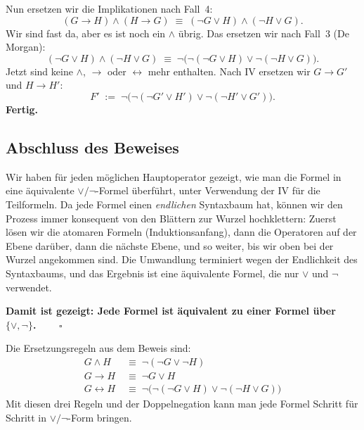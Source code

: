 \documentclass[a4paper,12pt]{article}
\begin{document}
Nun ersetzen wir die Implikationen nach Fall~4:
\[
(G \to H) \wedge (H \to G) \;\equiv\; (\neg G \vee H) \wedge (\neg H \vee G).
\]
Wir sind fast da, aber es ist noch ein $\wedge$ \"ubrig. Das ersetzen
wir nach Fall~3 (De Morgan):
\[
(\neg G \vee H) \wedge (\neg H \vee G) \;\equiv\;
\neg\bigl(\neg(\neg G \vee H) \vee \neg(\neg H \vee G)\bigr).
\]
Jetzt sind keine $\wedge$, $\to$ oder $\leftrightarrow$ mehr
enthalten. Nach IV ersetzen wir $G \to G'$ und $H \to H'$:
\[
F' \;:=\; \neg\bigl(\neg(\neg G' \vee H') \vee \neg(\neg H' \vee G')\bigr).
\]
\textbf{Fertig.}

\subsection*{Abschluss des Beweises}

Wir haben f\"ur jeden m\"oglichen Hauptoperator gezeigt, wie man die
Formel in eine \"aquivalente $\vee/\neg$-Formel \"uberf\"uhrt, unter
Verwendung der IV f\"ur die Teilformeln. Da jede Formel einen
\emph{endlichen} Syntaxbaum hat, k\"onnen wir den Prozess immer
konsequent von den Bl\"attern zur Wurzel hochklettern: Zuerst l\"osen
wir die atomaren Formeln (Induktionsanfang), dann die Operatoren
auf der Ebene dar\"uber, dann die n\"achste Ebene, und so weiter, bis
wir oben bei der Wurzel angekommen sind. Die Umwandlung terminiert
wegen der Endlichkeit des Syntaxbaums, und das Ergebnis ist eine
\"aquivalente Formel, die nur $\vee$ und $\neg$ verwendet.

\textbf{Damit ist gezeigt: Jede Formel ist \"aquivalent zu einer
Formel \"uber $\{\vee, \neg\}$.} $\qquad\square$

\begin{merkbox}[title={Ergebnis Aufgabe~2: $\{\vee, \neg\}$ ist funktional vollst\"andig}]
Die Ersetzungsregeln aus dem Beweis sind:
\begin{align*}
G \wedge H &\;\equiv\; \neg(\neg G \vee \neg H) \\
G \to H &\;\equiv\; \neg G \vee H \\
G \leftrightarrow H &\;\equiv\;
   \neg\bigl(\neg(\neg G \vee H) \vee \neg(\neg H \vee G)\bigr)
\end{align*}
Mit diesen drei Regeln und der Doppelnegation kann man jede Formel
Schritt f\"ur Schritt in $\vee/\neg$-Form bringen.
\end{merkbox}
\end{document}
